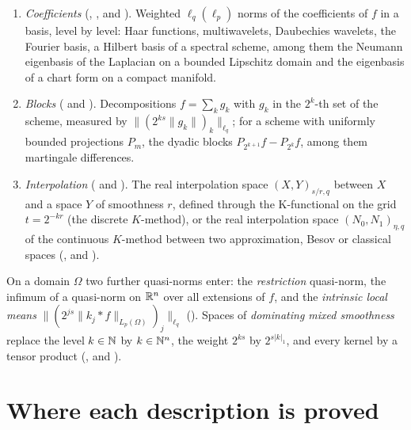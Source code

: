 \begin{enumerate}
    Decompositions into atoms $a_{j,m}$ of level $j$, supported near a cube of side $2^{-j}$,
    $f = \sum_j \sum_m \lambda_{j,m} a_{j,m}$, measured by
    \[
      \|\lambda\|_{b^s_{p,q}} = \bigl\|\bigl(2^{j(s - n/p)} \|\lambda_{j,\cdot}\|_{\ell_p}\bigr)_j
        \bigr\|_{\ell_q} .
    \]
  \item \emph{Coefficients} (, ,  and
    ).
    Weighted $\ell_q(\ell_p)$ norms of the coefficients of $f$ in a basis, level by level: Haar
    functions, multiwavelets, Daubechies wavelets, the Fourier basis, a Hilbert basis of a
    spectral scheme, among them the Neumann eigenbasis of the Laplacian on a bounded Lipschitz
    domain and the eigenbasis of a chart form on a compact manifold.
  \item \emph{Blocks} ( and ).
    Decompositions $f = \sum_k g_k$ with $g_k$ in the $2^k$-th set of the scheme, measured by
    $\|(2^{ks} \|g_k\|)_k\|_{\ell_q}$; for a scheme with uniformly bounded projections $P_m$, the
    dyadic blocks $P_{2^{k+1}} f - P_{2^k} f$, among them martingale differences.
  \item \emph{Interpolation} ( and ).
    The real interpolation space $(X, Y)_{s/r, q}$ between $X$ and a space $Y$ of smoothness $r$,
    defined through the K-functional on the grid $t = 2^{-kr}$ (the discrete $K$-method), or the
    real interpolation space $(N_0, N_1)_{\eta, q}$ of the continuous $K$-method between two
    approximation, Besov or classical spaces (,
     and ).
\end{enumerate}

On a domain $\Omega$ two further quasi-norms enter: the \emph{restriction} quasi-norm, the
infimum of a quasi-norm on $\mathbb{R}^n$ over all extensions of $f$, and the \emph{intrinsic local
means} $\|(2^{js} \|k_j * f\|_{L_p(\Omega)})_j\|_{\ell_q}$ ().
Spaces of \emph{dominating mixed smoothness} replace the level $k \in \mathbb{N}$ by $k \in \mathbb{N}^n$, the
weight $2^{ks}$ by $2^{s|k|_1}$, and every kernel by a tensor product
(,  and ).

\section{Where each description is proved}
\label{sec:where}


